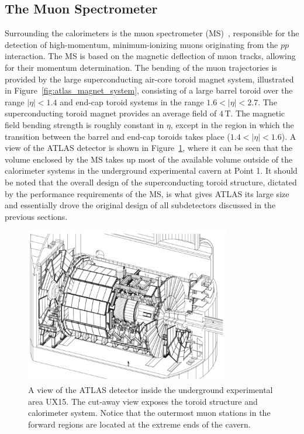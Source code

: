 \subsection{The Muon Spectrometer}
\label{sec:ms}

Surrounding the calorimeters is the muon spectrometer (MS)~\cite{CERN-LHCC-97-022}, responsible
for the detection of high-momentum, minimum-ionizing muons originating from the $pp$ interaction.
The MS is based on the magnetic deflection of muon tracks, allowing for their
momentum determination.
The bending of the muon trajectories is provided by the large
superconducting air-core toroid magnet system, illustrated in Figure~\ref{fig:atlas_magnet_system},
consisting of a large barrel toroid over the range $\lvert \eta \rvert < 1.4$
and end-cap toroid systems in the range $1.6 < \lvert \eta \rvert < 2.7$.
The superconducting toroid magnet provides an average field of $4\,$T.
The magnetic field bending strength is roughly constant in $\eta$, except in the
region in which the transition between the barrel and end-cap toroids takes place
($1.4 < \lvert \eta \rvert < 1.6$).
A view of the ATLAS detector is shown in Figure~\ref{fig:atlas_in_cavern},
where it can be seen that the volume enclosed by the MS takes up most of the available volume
outside of the calorimeter systems in the underground experimental cavern at Point 1.
It should be noted that the overall design of the superconducting toroid structure,
dictated by the performance requirements of the MS, is what gives ATLAS its large size and essentially
drove the original design of all subdetectors discussed in the previous sections.


\begin{figure}[!htb]
    \begin{center}
        \includegraphics[width=0.8\textwidth]{figures/chapter2/atlas_in_cavern}
        \caption{
            A view of the ATLAS detector inside the underground experimental area
            UX15.
            The cut-away view exposes the toroid structure and
            calorimeter system.
            Notice that the outermost muon stations in the forward regions are located
            at the extreme ends of the cavern.
        }
        \label{fig:atlas_in_cavern}
    \end{center}
\end{figure}
\FloatBarrier

